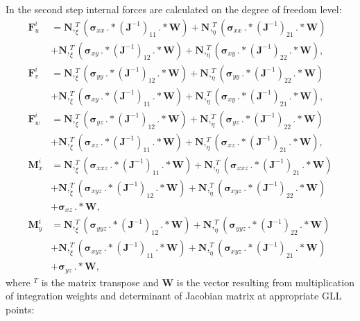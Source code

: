 \documentclass[preprint,12pt]{elsarticle}
\renewcommand{\vec}[1]{\mathbf{#1}}
\renewcommand{\bm}[1]{\mathbf{#1}}
\newcommand{\bs}[1]{\boldsymbol{#1}}
\begin{document}
	In the second step internal forces are calculated on the degree of freedom level: 
	\begin{equation}
	\begin{split}
	\vec{F}_u^i&=\bm{N},_{\xi}^T \left(\bs{\sigma}_{xx}\,.*(\vec{J}^{-1})_{11}\,.*\vec{W}\right)+\bm{N},_{\eta}^T \left(\bs{\sigma}_{xx}\,.*(\vec{J}^{-1})_{21}\,.*\vec{W}\right)\\
	&+\bm{N},_{\xi}^T \left(\bs{\sigma}_{xy}\,.*(\vec{J}^{-1})_{12}\,.*\vec{W}\right)+\bm{N},_{\eta}^T \left(\bs{\sigma}_{xy}\,.*(\vec{J}^{-1})_{22}\,.*\vec{W}\right), \\ 
	\vec{F}_v^i&=\bm{N},_{\xi}^T \left(\bs{\sigma}_{yy}\,.*(\vec{J}^{-1})_{12}\,.*\vec{W}\right)+\bm{N},_{\eta}^T \left(\bs{\sigma}_{yy}\,.*(\vec{J}^{-1})_{22}\,.*\vec{W}\right)\\
	&+\bm{N},_{\xi}^T \left(\bs{\sigma}_{xy}\,.*(\vec{J}^{-1})_{11}\,.*\vec{W}\right)+\bm{N},_{\eta}^T \left(\bs{\sigma}_{xy}\,.*(\vec{J}^{-1})_{21}\,.*\vec{W}\right),\\
	\vec{F}_w^i&=\bm{N},_{\xi}^T \left(\bs{\sigma}_{yz}\,.*(\vec{J}^{-1})_{12}\,.*\vec{W}\right)+\bm{N},_{\eta}^T \left(\bs{\sigma}_{yz}\,.*(\vec{J}^{-1})_{22}\,.*\vec{W}\right)\\
	& +\bm{N},_{\xi}^T \left(\bs{\sigma}_{xz}\,.*(\vec{J}^{-1})_{11}\,.*\vec{W}\right)+\bm{N},_{\eta}^T \left(\bs{\sigma}_{xz}\,.*(\vec{J}^{-1})_{21}\,.*\vec{W}\right),\\
	\vec{M}_x^i&=\bm{N},_{\xi}^T \left(\bs{\sigma}_{xxz}\,.*(\vec{J}^{-1})_{11}\,.*\vec{W}\right)+\bm{N},_{\eta}^T \left(\bs{\sigma}_{xxz}\,.*(\vec{J}^{-1})_{21}\,.*\vec{W}\right)\\
	&+\bm{N},_{\xi}^T \left(\bs{\sigma}_{xyz}\,.*(\vec{J}^{-1})_{12}\,.*\vec{W}\right)+\bm{N},_{\eta}^T \left(\bs{\sigma}_{xyz}\,.*(\vec{J}^{-1})_{22}\,.*\vec{W}\right)\\
	&+\bs{\sigma}_{xz}\,.*\vec{W},\\
	\vec{M}_y^i&=\bm{N},_{\xi}^T \left(\bs{\sigma}_{yyz}\,.*(\vec{J}^{-1})_{12}\,.*\vec{W}\right)+\bm{N},_{\eta}^T \left(\bs{\sigma}_{yyz}\,.*(\vec{J}^{-1})_{22}\,.*\vec{W}\right)\\
	&+\bm{N},_{\xi}^T \left(\bs{\sigma}_{xyz}\,.*(\vec{J}^{-1})_{11}\,.*\vec{W}\right)+\bm{N},_{\eta}^T \left(\bs{\sigma}_{xyz}\,.*(\vec{J}^{-1})_{21}\,.*\vec{W}\right)\\
	&+\bs{\sigma}_{yz}\,.*\vec{W},
	\label{eq:internal_forces}
	\end{split}
	\end{equation}
	where $^T$ is the matrix transpose and $\vec{W}$ is the vector resulting from multiplication of integration weights and determinant of Jacobian matrix at appropriate GLL points:
\end{document}
